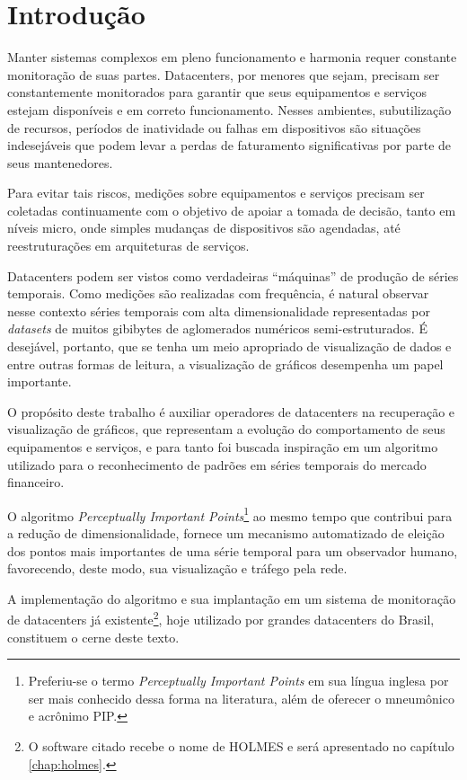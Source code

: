 \chapter{Introdução}
\label{chap:introducao}

Manter sistemas complexos em pleno funcionamento e harmonia requer constante monitoração de suas partes. Datacenters, por menores que sejam, precisam ser constantemente monitorados para garantir que seus equipamentos e serviços estejam disponíveis e em correto funcionamento. Nesses ambientes, subutilização de recursos, períodos de inatividade ou falhas em dispositivos são situações indesejáveis que podem levar a perdas de faturamento significativas por parte de seus mantenedores.

Para evitar tais riscos, medições sobre equipamentos e serviços precisam ser coletadas continuamente com o objetivo de apoiar a tomada de decisão, tanto em níveis micro, onde simples mudanças de dispositivos são agendadas, até reestruturações em arquiteturas de serviços. 

Datacenters podem ser vistos como verdadeiras ``máquinas'' de produção de séries temporais. Como medições são realizadas com frequência, é natural observar nesse contexto séries temporais com alta dimensionalidade representadas por \textit{datasets} de muitos gibibytes de aglomerados numéricos semi-estruturados. É desejável, portanto, que se tenha um meio apropriado de visualização de dados e entre outras formas de leitura, a visualização de gráficos desempenha um papel importante.

O propósito deste trabalho é auxiliar operadores de datacenters na recuperação e visualização de gráficos, que representam a evolução do comportamento de seus equipamentos e serviços, e para tanto foi buscada inspiração em um algoritmo utilizado para o reconhecimento de padrões em séries temporais do mercado financeiro. 

O algoritmo \textit{Perceptually Important Points}\footnote{Preferiu-se o termo \textit{Perceptually Important Points} em sua língua inglesa por ser mais conhecido dessa forma na literatura, além de oferecer o mneumônico e acrônimo PIP.} ao mesmo tempo que contribui para a redução de dimensionalidade, fornece um mecanismo automatizado de eleição dos pontos mais importantes de uma série temporal para um observador humano, favorecendo, deste modo, sua visualização e tráfego pela rede.

A implementação do algoritmo e sua implantação em um sistema de monitoração de datacenters já existente\footnote{O software citado recebe o nome de HOLMES e será apresentado no capítulo \ref{chap:holmes}.}, hoje utilizado por grandes datacenters do Brasil, constituem o cerne deste texto. 

